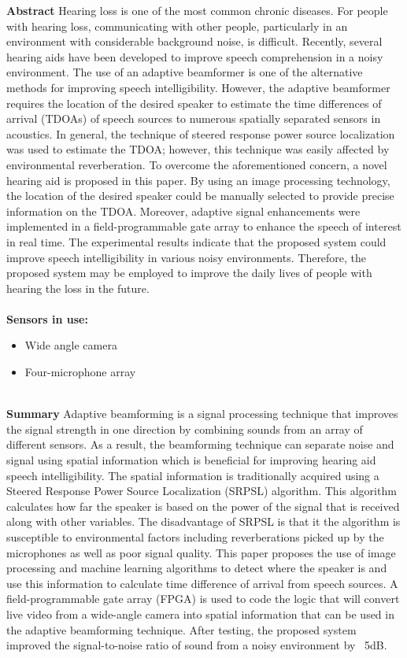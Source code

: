 \noindent
\textbf{Abstract} Hearing loss is one of the most common chronic diseases. For people with hearing loss, communicating with other people, particularly in an environment with considerable background noise, is difficult. Recently, several hearing aids have been developed to improve speech comprehension in a noisy environment. The use of an adaptive beamformer is one of the alternative methods for improving speech intelligibility. However, the adaptive beamformer requires the location of the desired speaker to estimate the time differences of arrival (TDOAs) of speech sources to numerous spatially separated sensors in acoustics. In general, the technique of steered response power source localization was used to estimate the TDOA; however, this technique was easily affected by environmental reverberation. To overcome the aforementioned concern, a novel hearing aid is proposed in this paper. By using an image processing technology, the location of the desired speaker could be manually selected to provide precise information on the TDOA. Moreover, adaptive signal enhancements were implemented in a field-programmable gate array to enhance the speech of interest in real time. The experimental results indicate that the proposed system could improve speech intelligibility in various noisy environments. Therefore, the proposed system may be employed to improve the daily lives of people with hearing the loss in the future. \\ \\

\noindent
\textbf{Sensors in use:}
\begin{itemize}
    \item Wide angle camera
    \item Four-microphone array \\ \\
\end{itemize}

\noindent
\textbf{Summary} Adaptive beamforming is a signal processing technique that improves the signal strength in one direction by combining sounds from an array of different sensors. As a result, the beamforming technique can separate noise and signal using spatial information which is beneficial for improving hearing aid speech intelligibility. The spatial information is traditionally acquired using a Steered Response Power Source Localization (SRPSL) algorithm. This algorithm calculates how far the speaker is based on the power of the signal that is received along with other variables. The disadvantage of SRPSL is that it the algorithm is susceptible to environmental factors including reverberations picked up by the microphones as well as poor signal quality. This paper proposes the use of image processing and machine learning algorithms to detect where the speaker is and use this information to calculate time difference of arrival from speech sources. A field-programmable gate array (FPGA) is used to code the logic that will convert live video from a wide-angle camera into spatial information that can be used in the adaptive beamforming technique. After testing, the proposed system improved the signal-to-noise ratio of sound from a noisy environment by ~5dB. \\ \\

